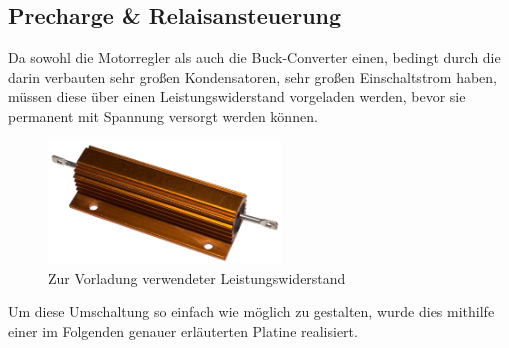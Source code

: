 \newpage
\subsection{Precharge \& Relaisansteuerung\label{sec:precharge}}
Da sowohl die Motorregler als auch die Buck-Converter einen, bedingt durch die darin verbauten sehr großen Kondensatoren, sehr großen Einschaltstrom haben, 
müssen diese über einen Leistungswiderstand vorgeladen werden, bevor sie permanent mit Spannung versorgt werden können.\\
\begin{figure}[h]
    \centering
    \includegraphics[width=0.55\textwidth]{Fotos/Leistungswiderstand.png}
    \caption{Zur Vorladung verwendeter Leistungswiderstand}
\end{figure}

Um diese Umschaltung so einfach wie möglich zu gestalten, wurde dies mithilfe einer im Folgenden genauer erläuterten Platine realisiert. 

